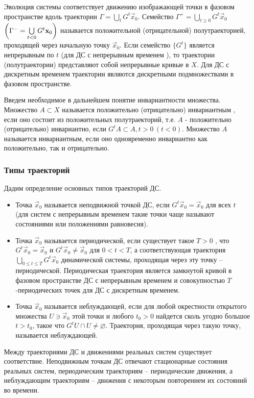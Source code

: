  Эволюция системы соответствует движению изображающей точки в фазовом пространстве вдоль траектории $\Gamma = \bigcup\limits_t G^t \vec x_0$. Семейство $ \Gamma^+ = \bigcup\limits_{t\geq 0} G^t \vec x_0 $\quad  $ \qty(\Gamma^- = \bigcup\limits_{t< 0} G^t \mathbf x_0)$ называется положительной (отрицательной) полутраекторией, проходящей через начальную точку $\vec x_0$. Если семейство $\{G^t\}$ является непрерывным по $t$ (для ДС с непрерывным временем ), то траектории (полутраектории) представляют собой непрерывные кривые в $X$. Для ДС с дискретным временем траектории являются дискретными подмножествами в фазовом пространстве.

 Введем необходимое в дальнейшем понятие инвариантности множества.
 Множество $A \subset X$ называется положительно (отрицательно) инвариантным , если оно состоит из положительных полутраекторий, т.е. $A$ - положительно (отрицательно) инвариантно, если $G^t A \subset A, t>0 ~ (t<0)$. Множество $A$ называется инвариантным, если оно одновременно инвариантно как положительно, так и отрицательно.	


\subsubsection{Типы траекторий} %
Дадим определение основных типов траекторий ДС.
\begin{itemize}
	\item Точка $\vec x_0$ называется неподвижной точкой ДС, если $G^t \vec x_0 = \vec x_0$ для всех $t$ (для систем с непрерывным временем такие точки чаще называют состояниями или положениями равновесия).
	\item Точка $\vec x_0$ называется периодической, если существует такое $T>0$ , что $G^t \vec x_0 = \vec x_0$ и $G^t \vec x_0 \neq \vec x_0$ для $0<t<T$, а соответствующая траектория $\bigcup\limits_{0\leq t \leq T} G^t \vec x_0$ динамической системы, проходящая через эту точку -- периодической. Периодическая траектория является замкнутой кривой в фазовом пространстве ДС с непрерывным временем и совокупностью $T$-периодических точек для ДС с дискретным временем.
	\item Точка $\vec x_0$ называется неблуждающей, если для любой окрестности открытого множества $U \ni \vec x_0$ этой точки и любого $t_0>0$ найдется сколь угодно большое $t>t_0$, такое что $G^t U \cap U \neq \varnothing $. Траектория, проходящая через такую точку, называется неблуждающей. 
\end{itemize}

Между траекториями ДС и движениями реальных систем существует соответствие. Неподвижным точкам ДС отвечают стационарные состояния реальных систем, периодическим траекториям -- периодические движения, а неблуждающим траекториям -- движения с некоторым повторением их состояний во времени.

